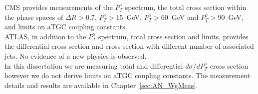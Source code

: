 CMS provides measurements of the $P_T^\gamma$ spectrum, the total cross section within the phase spaces of $\Delta R>0.7$, $P_T^\gamma>15$~GeV, $P_T^\gamma>60$~GeV and $P_T^\gamma>90$~GeV, and limits on aTGC coupling constants.\\

ATLAS, in addition to the $P_T^\gamma$ spectrum, total cross section and limits, provides the differential cross section and cross section with different number of associated jets. No evidence of a new physics is observed.\\

In this dissertation we are measuring total and differential $d\sigma/d P_T^\gamma$ cross section however we do not derive limits on aTGC coupling constants. The measurement details and results are available in Chapter~\ref{sec:AN_WgMeas}.\\

